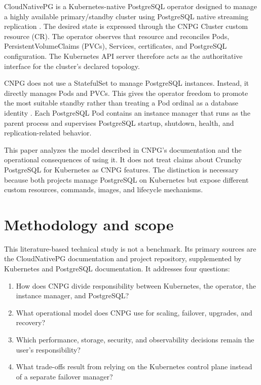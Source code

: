 \documentclass[11pt,a4paper]{article}
\begin{document}
CloudNativePG is a Kubernetes-native PostgreSQL operator designed to manage a highly available primary/standby cluster using PostgreSQL native streaming replication \cite{cnpg-home,cnpg-architecture}. The desired state is expressed through the CNPG Cluster custom resource (CR). The operator observes that resource and reconciles Pods, PersistentVolumeClaims (PVCs), Services, certificates, and PostgreSQL configuration. The Kubernetes API server therefore acts as the authoritative interface for the cluster's declared topology.

CNPG does not use a StatefulSet to manage PostgreSQL instances. Instead, it directly manages Pods and PVCs. This gives the operator freedom to promote the most suitable standby rather than treating a Pod ordinal as a database identity \cite{cnpg-architecture,cnpg-instance-manager}. Each PostgreSQL Pod contains an instance manager that runs as the parent process and supervises PostgreSQL startup, shutdown, health, and replication-related behavior.

This paper analyzes the model described in CNPG's documentation and the operational consequences of using it. It does not treat claims about Crunchy PostgreSQL for Kubernetes as CNPG features. The distinction is necessary because both projects manage PostgreSQL on Kubernetes but expose different custom resources, commands, images, and lifecycle mechanisms.

\section{Methodology and scope}

This literature-based technical study is not a benchmark. Its primary sources are the CloudNativePG documentation and project repository, supplemented by Kubernetes and PostgreSQL documentation. It addresses four questions:

\begin{enumerate}
  \item How does CNPG divide responsibility between Kubernetes, the operator, the instance manager, and PostgreSQL?
  \item What operational model does CNPG use for scaling, failover, upgrades, and recovery?
  \item Which performance, storage, security, and observability decisions remain the user's responsibility?
  \item What trade-offs result from relying on the Kubernetes control plane instead of a separate failover manager?
\end{enumerate}
\end{document}
